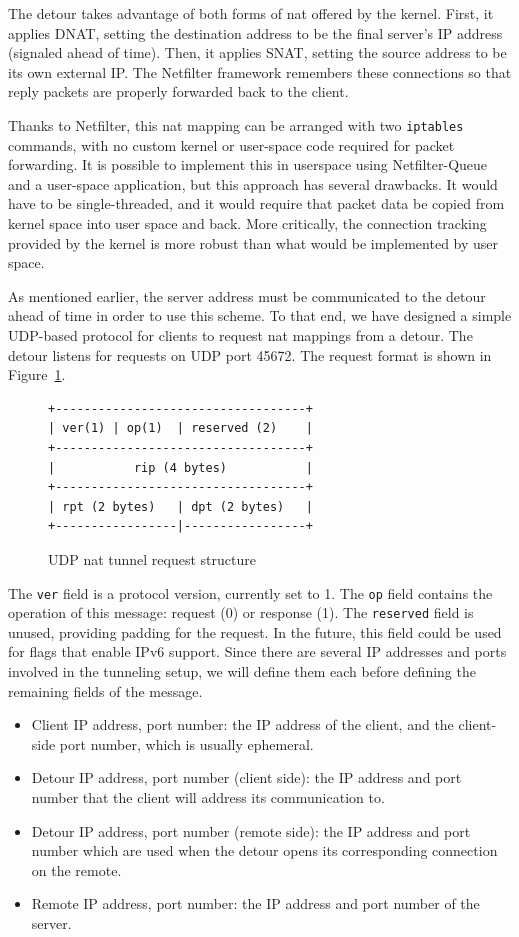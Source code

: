 \documentclass{cwru}
\begin{document}
The detour takes advantage of both forms of \ac{nat} offered by the kernel.
First, it applies DNAT, setting the destination address to be the final server's
IP address (signaled ahead of time). Then, it applies SNAT, setting the source
address to be its own external IP. The Netfilter framework remembers these
connections so that reply packets are properly forwarded back to the client.

Thanks to Netfilter, this \ac{nat} mapping can be arranged with two
\texttt{iptables} commands, with no custom kernel or user-space code required
for packet forwarding. It is possible to implement this in userspace using
Netfilter-Queue and a user-space application, but this approach has several
drawbacks. It would have to be single-threaded, and it would require that packet
data be copied from kernel space into user space and back. More critically, the
connection tracking provided by the kernel is more robust than what would be
implemented by user space.

As mentioned earlier, the server address must be communicated to the detour
ahead of time in order to use this scheme. To that end, we have designed a
simple UDP-based protocol for clients to request \ac{nat} mappings from a
detour. The detour listens for requests on UDP port 45672. The request format is
shown in Figure~\ref{fig:udp-nat-packet}.

\begin{figure}
  \centering
\begin{BVerbatim}
+-----------------------------------+
| ver(1) | op(1)  | reserved (2)    |
+-----------------------------------+
|           rip (4 bytes)           |
+-----------------------------------+
| rpt (2 bytes)   | dpt (2 bytes)   |
+-----------------|-----------------+
\end{BVerbatim}
  \caption{UDP \ac{nat} tunnel request structure}
  \label{fig:udp-nat-packet}
\end{figure}

The \texttt{ver} field is a protocol version, currently set to 1. The
\texttt{op} field contains the operation of this message: request (0) or
response (1). The \texttt{reserved} field is unused, providing padding for the
request. In the future, this field could be used for flags that enable IPv6
support. Since there are several IP addresses and ports involved in the
tunneling setup, we will define them each before defining the remaining fields
of the message.

\begin{itemize}
\item Client IP address, port number: the IP address of the client, and the
  client-side port number, which is usually ephemeral.
\item Detour IP address, port number (client side): the IP address and port
  number that the client will address its communication to.
\item Detour IP address, port number (remote side): the IP address and port
  number which are used when the detour opens its corresponding connection on
  the remote.
\item Remote IP address, port number: the IP address and port number of the
  server.
\end{itemize}
\end{document}
